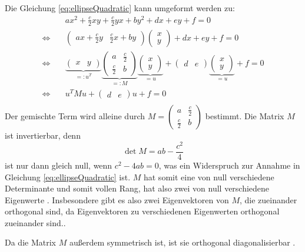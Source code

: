 Die Gleichung \ref{eq:ellipseQuadratic} kann umgeformt werden zu:
\[
\begin{aligned}
&ax^2 + \frac{c}{2}xy + \frac{c}{2}yx + by^2 + dx + ey + f = 0 \\
\Leftrightarrow\quad &\begin{pmatrix}ax +  \frac{c}{2}y & \frac{c}{2}x + by\end{pmatrix}\begin{pmatrix}x \\ y\end{pmatrix} +  dx + ey + f = 0\\
\Leftrightarrow\quad &\underbrace{\begin{pmatrix}x & y\end{pmatrix}}_{=:u^T}\underbrace{\begin{pmatrix}a & \frac{c}{2} \\ \frac{c}{2} & b\end{pmatrix}}_{=: M}\underbrace{\begin{pmatrix}x \\ y\end{pmatrix}}_{=u} +\begin{pmatrix}d & e\end{pmatrix}\underbrace{\begin{pmatrix}x \\ y\end{pmatrix}}_{=u}+ f = 0 \\
\Leftrightarrow\quad &u^TMu +\begin{pmatrix}d & e\end{pmatrix}u + f = 0 \\
\end{aligned}
\]
Der gemischte Term wird alleine durch $M = \begin{pmatrix}a & \frac{c}{2} \\ \frac{c}{2} & b\end{pmatrix}$ bestimmt. Die Matrix $M$ ist invertierbar, denn
\[
\det M = ab - \dfrac{c^2}{4}
\] ist nur dann gleich null, wenn $c^2 - 4ab = 0$, was ein Widerspruch zur Annahme in Gleichung \ref{eq:ellipseQuadratic} ist. $M$ hat somit eine von null verschiedene Determinante und somit vollen Rang, hat also zwei von null verschiedene Eigenwerte \cite[S. 199]{Bosch2006}. Insbesondere gibt es also zwei Eigenvektoren von $M$, die zueinander orthogonal sind, da Eigenvektoren zu verschiedenen Eigenwerten orthogonal zueinander sind.\cite[S. 198]{Bosch2006}.

Da die Matrix $M$ außerdem symmetrisch ist, ist sie orthogonal diagonalisierbar \cite[S. 278]{Bosch2006}.

